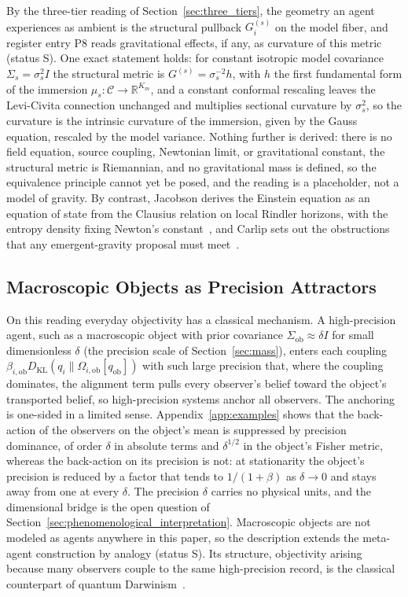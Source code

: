 \documentclass[11pt]{article}
\begin{document}
By the three-tier reading of Section~\ref{sec:three_tiers}, the geometry an agent experiences as ambient is the structural pullback $G^{(s)}_i$ on the model fiber, and register entry P8 reads gravitational effects, if any, as curvature of this metric (status S). One exact statement holds: for constant isotropic model covariance $\Sigma_s = \sigma_s^2 I$ the structural metric is $G^{(s)} = \sigma_s^{-2} h$, with $h$ the first fundamental form of the immersion $\mu_s: \mathcal{C} \to \mathbb{R}^{K_m}$, and a constant conformal rescaling leaves the Levi-Civita connection unchanged and multiplies sectional curvature by $\sigma_s^2$, so the curvature is the intrinsic curvature of the immersion, given by the Gauss equation, rescaled by the model variance. Nothing further is derived: there is no field equation, source coupling, Newtonian limit, or gravitational constant, the structural metric is Riemannian, and no gravitational mass is defined, so the equivalence principle cannot yet be posed, and the reading is a placeholder, not a model of gravity. By contrast, Jacobson derives the Einstein equation as an equation of state from the Clausius relation on local Rindler horizons, with the entropy density fixing Newton's constant~\cite{Jacobson1995}, and Carlip sets out the obstructions that any emergent-gravity proposal must meet~\cite{Carlip2014}.

\subsection{Macroscopic Objects as Precision Attractors}

On this reading everyday objectivity has a classical mechanism. A high-precision agent, such as a macroscopic object with prior covariance $\Sigma_{\mathrm{ob}} \approx \delta I$ for small dimensionless $\delta$ (the precision scale of Section~\ref{sec:mass}), enters each coupling $\beta_{i,\mathrm{ob}} D_{\mathrm{KL}}(q_i \| \Omega_{i,\mathrm{ob}}[q_{\mathrm{ob}}])$ with such large precision that, where the coupling dominates, the alignment term pulls every observer's belief toward the object's transported belief, so high-precision systems anchor all observers. The anchoring is one-sided in a limited sense. Appendix~\ref{app:examples} shows that the back-action of the observers on the object's mean is suppressed by precision dominance, of order $\delta$ in absolute terms and $\delta^{1/2}$ in the object's Fisher metric, whereas the back-action on its precision is not: at stationarity the object's precision is reduced by a factor that tends to $1/(1+\beta)$ as $\delta \to 0$ and stays away from one at every $\delta$. The precision $\delta$ carries no physical units, and the dimensional bridge is the open question of Section~\ref{sec:phenomenological_interpretation}. Macroscopic objects are not modeled as agents anywhere in this paper, so the description extends the meta-agent construction by analogy (status S). Its structure, objectivity arising because many observers couple to the same high-precision record, is the classical counterpart of quantum Darwinism~\cite{Zurek2009}.
\end{document}
